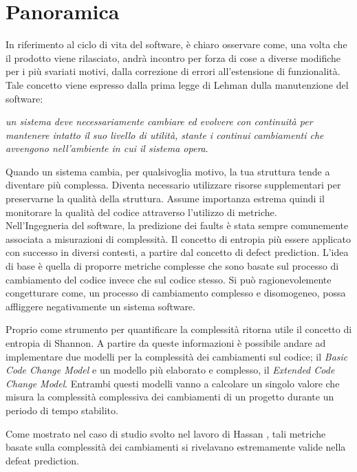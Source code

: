 \chapter{Panoramica}

In riferimento al ciclo di vita del software, è chiaro osservare come, una volta che il prodotto viene rilasciato, andrà incontro per forza di cose a diverse modifiche per i più svariati motivi, dalla correzione di errori all'estensione di funzionalità. Tale concetto viene espresso dalla prima legge di Lehman dulla manutenzione del software:
\begin{center}
\textit{un sistema deve necessariamente cambiare ed evolvere con continuità per mantenere intatto il suo livello di utilità, stante i continui cambiamenti che avvengono nell'ambiente in cui il sistema opera}.
\end{center}
Quando un sistema cambia, per qualsivoglia motivo, la tua struttura tende a diventare più complessa. Diventa necessario utilizzare risorse supplementari per preservarne la qualità della struttura. Assume importanza estrema quindi il monitorare la qualità del codice attraverso l'utilizzo di metriche.\\

Nell'Ingegneria del software, la predizione dei faults è stata sempre comunemente associata a misurazioni di complessità. Il concetto di entropia più essere applicato con successo in diversi contesti, a partire dal concetto di defect prediction. L'idea di base è quella di proporre metriche complesse che sono basate sul processo di cambiamento del codice invece che sul codice stesso. Si può ragionevolemente congetturare come, un processo di cambiamento complesso e disomogeneo, possa affliggere negativamente un sistema software. 

Proprio come strumento per quantificare la complessità ritorna utile il concetto di entropia di Shannon. A partire da queste informazioni è possibile andare ad implementare due modelli per la complessità dei cambiamenti sul codice; il \textit{Basic Code Change Model} e un modello più elaborato e complesso, il \textit{Extended Code Change Model}. Entrambi questi modelli vanno a calcolare un singolo valore che misura la complessità complessiva dei cambiamenti di un progetto durante un periodo di tempo stabilito. 

Come mostrato nel caso di studio svolto nel lavoro di Hassan \cite{hassan2009predicting}, tali metriche basate sulla complessità dei cambiamenti si rivelavano estremamente valide nella defeat prediction.\\

